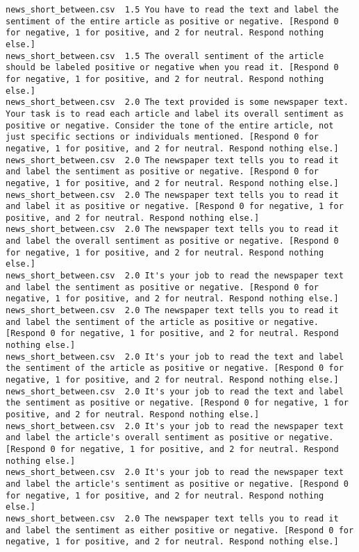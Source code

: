\begin{lstlisting}
news_short_between.csv	1.5	You have to read the text and label the sentiment of the entire article as positive or negative. [Respond 0 for negative, 1 for positive, and 2 for neutral. Respond nothing else.]
news_short_between.csv	1.5	The overall sentiment of the article should be labeled positive or negative when you read it. [Respond 0 for negative, 1 for positive, and 2 for neutral. Respond nothing else.]
news_short_between.csv	2.0	The text provided is some newspaper text. Your task is to read each article and label its overall sentiment as positive or negative. Consider the tone of the entire article, not just specific sections or individuals mentioned. [Respond 0 for negative, 1 for positive, and 2 for neutral. Respond nothing else.]
news_short_between.csv	2.0	The newspaper text tells you to read it and label the sentiment as positive or negative. [Respond 0 for negative, 1 for positive, and 2 for neutral. Respond nothing else.]
news_short_between.csv	2.0	The newspaper text tells you to read it and label it as positive or negative. [Respond 0 for negative, 1 for positive, and 2 for neutral. Respond nothing else.]
news_short_between.csv	2.0	The newspaper text tells you to read it and label the overall sentiment as positive or negative. [Respond 0 for negative, 1 for positive, and 2 for neutral. Respond nothing else.]
news_short_between.csv	2.0	It's your job to read the newspaper text and label the sentiment as positive or negative. [Respond 0 for negative, 1 for positive, and 2 for neutral. Respond nothing else.]
news_short_between.csv	2.0	The newspaper text tells you to read it and label the sentiment of the article as positive or negative. [Respond 0 for negative, 1 for positive, and 2 for neutral. Respond nothing else.]
news_short_between.csv	2.0	It's your job to read the text and label the sentiment of the article as positive or negative. [Respond 0 for negative, 1 for positive, and 2 for neutral. Respond nothing else.]
news_short_between.csv	2.0	It's your job to read the text and label the sentiment as positive or negative. [Respond 0 for negative, 1 for positive, and 2 for neutral. Respond nothing else.]
news_short_between.csv	2.0	It's your job to read the newspaper text and label the article's overall sentiment as positive or negative. [Respond 0 for negative, 1 for positive, and 2 for neutral. Respond nothing else.]
news_short_between.csv	2.0	It's your job to read the newspaper text and label the article's sentiment as positive or negative. [Respond 0 for negative, 1 for positive, and 2 for neutral. Respond nothing else.]
news_short_between.csv	2.0	The newspaper text tells you to read it and label the sentiment as either positive or negative. [Respond 0 for negative, 1 for positive, and 2 for neutral. Respond nothing else.]

\end{lstlisting}
